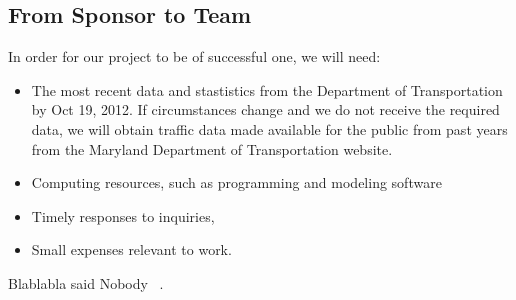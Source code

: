\documentclass[12pt,letterpaper]{article}
\theoremstyle{definition}
\begin{document}
\subsection{From Sponsor to Team} %

In order for our project to be of successful one, we will need:
\begin{itemize}
    \item The most recent data and stastistics from the Department of Transportation by Oct 19, 2012. If circumstances change and we do not receive the required data, we will obtain traffic data made available for the public from past years from the Maryland Department of Transportation website.
    \item Computing resources, such as programming and modeling software
    \item Timely responses to inquiries, 
    \item Small expenses relevant to work.
\end{itemize}

Blablabla said Nobody ~\cite{Nobody06}.


{}
\end{document}
